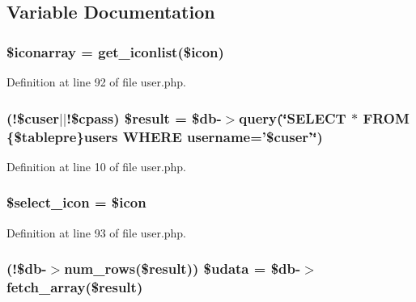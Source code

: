 \subsection{Variable Documentation}
\hypertarget{user_8php_ae8f70f9240aceaf398e05d6e00e7b8e5}{
\subsubsection[{\$iconarray}]{\setlength{\rightskip}{0pt plus 5cm}\$iconarray = {\bf get\+\_\+iconlist}(\$icon)}}\label{user_8php_ae8f70f9240aceaf398e05d6e00e7b8e5}


Definition at line 92 of file user.\+php.

\hypertarget{user_8php_aa26a75c10464e039aa68f93507070136}{
\subsubsection[{\$result}]{ (!\$cuser$\vert$$\vert$!\$cpass) \${\bf result} = \$db-\/$>$query(\char`\"{}S\+E\+L\+E\+C\+T $\ast$ F\+R\+O\+M \{\$tablepre\}users W\+H\+E\+R\+E username='\$cuser'\char`\"{})}}\label{user_8php_aa26a75c10464e039aa68f93507070136}


Definition at line 10 of file user.\+php.

\hypertarget{user_8php_a18d851a26297fb49eda4d94e0605ba05}{
\subsubsection[{\$select\+\_\+icon}]{\setlength{\rightskip}{0pt plus 5cm}\$select\+\_\+icon = \$icon}}\label{user_8php_a18d851a26297fb49eda4d94e0605ba05}


Definition at line 93 of file user.\+php.

\hypertarget{user_8php_aa64a6e7c321a5fc5c5089fc201f285cb}{
\subsubsection[{\$udata}]{ (!\$db-\/$>$num\+\_\+rows(\${\bf result})) \$udata = \$db-\/$>$fetch\+\_\+array(\${\bf result})}}\label{user_8php_aa64a6e7c321a5fc5c5089fc201f285cb}



